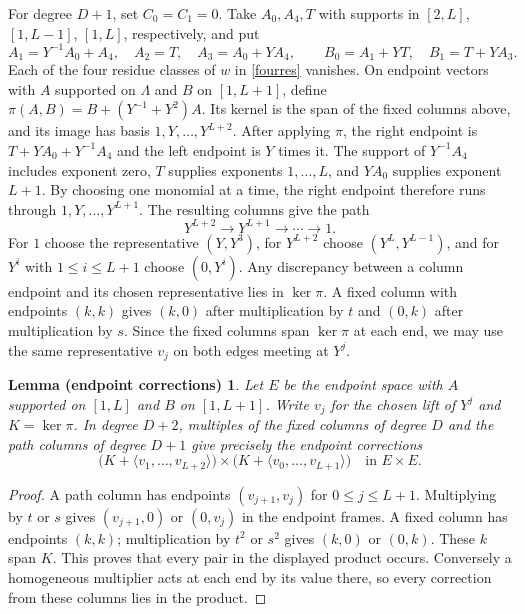 \documentclass[11pt,a4paper,reqno]{amsart}
\numberwithin{equation}{section}
\theoremstyle{plain}
\newtheorem*{correctionlemma}{Lemma (endpoint corrections)}
\begin{document}
For degree $D+1$, set $C_0=C_1=0$. Take $A_0,A_4,T$ with supports in $[2,L]$, $[1,L-1]$, $[1,L]$, respectively, and put
\[
 A_1=Y^{-1}A_0+A_4,\quad A_2=T,\quad A_3=A_0+YA_4,\qquad
 B_0=A_1+YT,\quad B_1=T+YA_3 .
\]
Each of the four residue classes of $w$ in \eqref{fourres} vanishes. On endpoint vectors with $A$ supported on $\Lambda$ and $B$ on $[1,L+1]$, define $\pi(A,B)=B+(Y^{-1}+Y^2)A$. Its kernel is the span of the fixed columns above, and its image has basis $1,Y,\dots,Y^{L+2}$. After applying $\pi$, the right endpoint is $T+YA_0+Y^{-1}A_4$ and the left endpoint is $Y$ times it. The support of $Y^{-1}A_4$ includes exponent zero, $T$ supplies exponents $1,\ldots,L$, and $YA_0$ supplies exponent $L+1$. By choosing one monomial at a time, the right endpoint therefore runs through $1,Y,\ldots,Y^{L+1}$. The resulting columns give the path
\[
 Y^{L+2}\longrightarrow Y^{L+1}\longrightarrow\cdots\longrightarrow 1 .
\]
For $1$ choose the representative $(Y,Y^3)$, for $Y^{L+2}$ choose $(Y^L,Y^{L-1})$, and for $Y^i$ with $1\le i\le L+1$ choose $(0,Y^i)$. Any discrepancy between a column endpoint and its chosen representative lies in $\ker\pi$. A fixed column with endpoints $(k,k)$ gives $(k,0)$ after multiplication by $t$ and $(0,k)$ after multiplication by $s$. Since the fixed columns span $\ker\pi$ at each end, we may use the same representative $v_j$ on both edges meeting at $Y^j$.

\begin{correctionlemma}
Let $E$ be the endpoint space with $A$ supported on $[1,L]$ and $B$ on $[1,L+1]$. Write $v_j$ for the chosen lift of $Y^j$ and $K=\ker\pi$. In degree $D+2$, multiples of the fixed columns of degree $D$ and the path columns of degree $D+1$ give precisely the endpoint corrections
\[
 \bigl(K+\langle v_1,\ldots,v_{L+2}\rangle\bigr)
 \times
 \bigl(K+\langle v_0,\ldots,v_{L+1}\rangle\bigr)
 \quad\text{in }E\times E .
\]
\end{correctionlemma}
\begin{proof}
A path column has endpoints $(v_{j+1},v_j)$ for $0\le j\le L+1$. Multiplying by $t$ or $s$ gives $(v_{j+1},0)$ or $(0,v_j)$ in the endpoint frames. A fixed column has endpoints $(k,k)$; multiplication by $t^2$ or $s^2$ gives $(k,0)$ or $(0,k)$. These $k$ span $K$. This proves that every pair in the displayed product occurs. Conversely a homogeneous multiplier acts at each end by its value there, so every correction from these columns lies in the product.
\end{proof}
\end{document}
